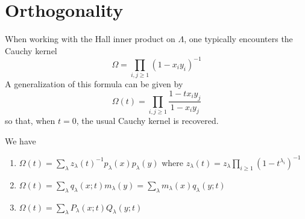 \documentclass[11pt,leqno,oneside]{amsart}
\numberwithin{thm}{section}
\newcommand{\sym}{\Lambda}
\begin{document}
\section{Orthogonality}
When working with the Hall inner product on \(\sym\), one typically
encounters the Cauchy kernel \[
  \Omega = \prod_{i,j \geq 1} (1-x_i y_i)^{-1}
\]
A generalization of this formula can be given by \[
  \Omega(t) = \prod_{i,j \geq 1} \frac{1-t x_i y_j}{1-x_i y_j}
\]
so that, when \(t=0\), the usual Cauchy kernel is recovered.
\begin{thm}
  We have
  \begin{enumerate}
  \item \(\Omega(t) = \sum_\lambda z_\lambda(t)^{-1} p_\lambda(x)
    p_\lambda(y)\) where \(z_\lambda(t) = z_\lambda \prod_{i \geq 1}
    (1-t^{\lambda_i})^{-1}\)
  \item \(\Omega(t) = \sum_{\lambda} q_\lambda(x;t) m_\lambda(y) =
    \sum_{\lambda} m_\lambda(x) q_\lambda(y;t)\)
  \item \(\Omega(t) = \sum_{\lambda} P_\lambda(x;t) Q_\lambda(y;t)\)
  \end{enumerate}
\end{thm}
\end{document}
